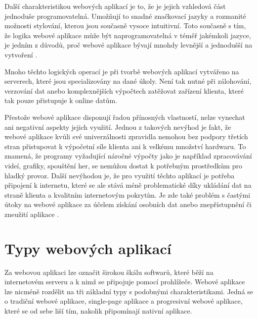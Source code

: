 Další charakteristikou webových aplikací je to, že je jejich vzhledová část jednoduše programovatelná. Umožňují to snadné značkovací jazyky a rozmanité možnosti stylování, kterou jsou současně vysoce intuitivní. Toto současně s tím, že logika webové aplikace může být naprogramovatelná v téměř jakémkoli jazyce, je jedním z důvodů, proč webové aplikace bývají mnohdy levnější a jednodušší na vytvoření \cite{characteristics}.

Mnoho těchto logických operací je při tvorbě webových aplikací vytvářeno na serverech, které jsou specializovány na dané úkoly. Není tak nutné při zálohování, verzování dat anebo komplexnějších výpočtech zatěžovat zařízení klienta, které tak pouze přistupuje k online datům.

Přestože webové aplikace disponují řadou přínosných vlastností, nelze vynechat ani negativní aspekty jejich využití. Jednou z takových nevýhod je fakt, že webové aplikace kvůli své univerzálnosti zpravidla nemohou bez podpory třetích stran přistupovat k výpočetní síle klienta ani k velkému množství hardwaru. To znamená, že programy vyžadující náročné výpočty jako je například zpracovávání videí, grafiky, spouštění her, se nemůžou dostat k potřebným prostředkům pro hladký provoz. Další nevýhodou je, že pro využití těchto aplikací je potřeba připojení k internetu, které se ale stává méně problematické díky ukládání dat na straně klienta a kvalitním internetovým pokrytím. Je zde také problém s častými útoky na webové aplikace za účelem získání osobních dat anebo znepřístupnění či zneužití aplikace \cite{modernapps}.

    \section{Typy webových aplikací}
Za webovou aplikaci lze označit širokou škálu softwarů, které běží na internetovém serveru a k nimž se připojuje pomocí prohlížeče. Webové aplikace lze nicméně rozdělit na tři základní typy s podobnými charakteristikami. Jedná se o tradiční webové aplikace, single-page aplikace a progresivní webové aplikace, které se od sebe liší tím, nakolik připomínají nativní aplikace.

